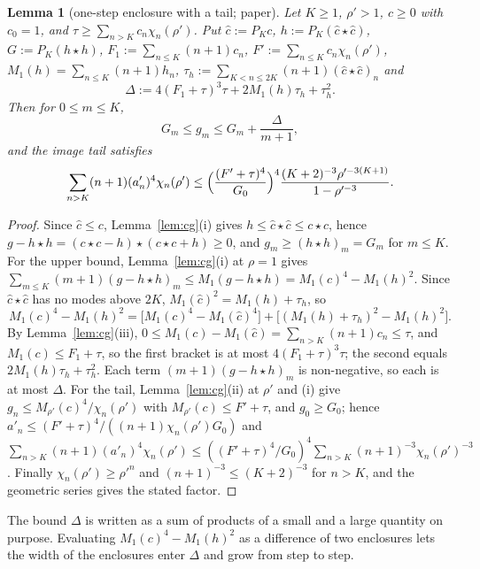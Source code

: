 \documentclass[11pt,a4paper]{article}
\newtheorem{lemma}[theorem]{Lemma}
\theoremstyle{definition}
\theoremstyle{remark}
\begin{document}
\begin{lemma}[one-step enclosure with a tail; paper]\label{lem:step}
Let $K\ge1$, $\rho'>1$, $c\ge0$ with $c_0=1$, and $\tau\ge\sum_{n>K}c_n\chi_n(\rho')$.
Put $\hat c:=P_Kc$, $h:=P_K(\hat c\star\hat c)$, $G:=P_K(h\star h)$, $F_1:=\sum_{n\le K}(n+1)c_n$, $F':=\sum_{n\le K}c_n\chi_n(\rho')$, $M_1(h)=\sum_{n\le K}(n+1)h_n$, $\tau_h:=\sum_{K<n\le2K}(n+1)(\hat c\star\hat c)_n$ and
\[
\Delta:=4(F_1+\tau)^3\tau+2M_1(h)\tau_h+\tau_h^2 .
\]
Then for $0\le m\le K$,
\[
G_m\le g_m\le G_m+\frac{\Delta}{m+1},
\]
and the image tail satisfies
\[
\sum_{n>K}(n+1)(a'_n)^4\chi_n(\rho')\le\Bigl(\frac{(F'+\tau)^4}{G_0}\Bigr)^4\frac{(K+2)^{-3}\rho'^{-3(K+1)}}{1-\rho'^{-3}} .
\]
\end{lemma}
\begin{proof}
Since $\hat c\le c$, Lemma~\ref{lem:cg}(i) gives $h\le\hat c\star\hat c\le c\star c$, hence $g-h\star h=(c\star c-h)\star(c\star c+h)\ge0$, and $g_m\ge(h\star h)_m=G_m$ for $m\le K$.
For the upper bound, Lemma~\ref{lem:cg}(i) at $\rho=1$ gives $\sum_{m\le K}(m+1)(g-h\star h)_m\le M_1(g-h\star h)=M_1(c)^4-M_1(h)^2$.
Since $\hat c\star\hat c$ has no modes above $2K$, $M_1(\hat c)^2=M_1(h)+\tau_h$, so
\[
M_1(c)^4-M_1(h)^2=\bigl[M_1(c)^4-M_1(\hat c)^4\bigr]+\bigl[(M_1(h)+\tau_h)^2-M_1(h)^2\bigr].
\]
By Lemma~\ref{lem:cg}(iii), $0\le M_1(c)-M_1(\hat c)=\sum_{n>K}(n+1)c_n\le\tau$, and $M_1(c)\le F_1+\tau$, so the first bracket is at most $4(F_1+\tau)^3\tau$; the second equals $2M_1(h)\tau_h+\tau_h^2$.
Each term $(m+1)(g-h\star h)_m$ is non-negative, so each is at most $\Delta$.
For the tail, Lemma~\ref{lem:cg}(ii) at $\rho'$ and (i) give $g_n\le M_{\rho'}(c)^4/\chi_n(\rho')$ with $M_{\rho'}(c)\le F'+\tau$, and $g_0\ge G_0$; hence $a'_n\le(F'+\tau)^4/((n+1)\chi_n(\rho')G_0)$ and
$\sum_{n>K}(n+1)(a'_n)^4\chi_n(\rho')\le((F'+\tau)^4/G_0)^4\sum_{n>K}(n+1)^{-3}\chi_n(\rho')^{-3}$.
Finally $\chi_n(\rho')\ge\rho'^n$ and $(n+1)^{-3}\le(K+2)^{-3}$ for $n>K$, and the geometric series gives the stated factor.
\end{proof}
The bound $\Delta$ is written as a sum of products of a small and a large quantity on purpose.
Evaluating $M_1(c)^4-M_1(h)^2$ as a difference of two enclosures lets the width of the enclosures enter $\Delta$ and grow from step to step.
\end{document}
